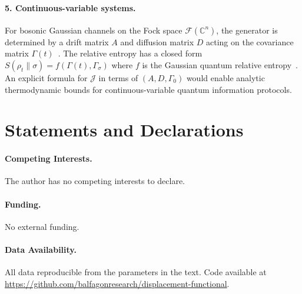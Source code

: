 \documentclass[11pt,a4paper]{article}
\theoremstyle{definition}
\theoremstyle{remark}
\begin{document}
\paragraph{5. Continuous-variable systems.}
For bosonic Gaussian channels on the Fock space $\mathcal{F}(\mathbb{C}^n)$, 
the generator is determined by a drift matrix $A$ and diffusion matrix $D$ 
acting on the covariance matrix $\Gamma(t)$~\cite{Holevo2011}. The relative 
entropy has a closed form $S(\rho_t\|\sigma) = f(\Gamma(t), \Gamma_\sigma)$ 
where $f$ is the Gaussian quantum relative entropy~\cite{Holevo2011}. 
An explicit formula for $\mathcal{J}$ in terms of $(A, D, \Gamma_0)$ would 
enable analytic thermodynamic bounds for continuous-variable quantum 
information protocols.

\section*{Statements and Declarations}

\paragraph{Competing Interests.}
The author has no competing interests to declare.

\paragraph{Funding.}
No external funding.

\paragraph{Data Availability.}
All data reproducible from the parameters in the text. Code available at 
\url{https://github.com/balfagonresearch/displacement-functional}.
\end{document}
